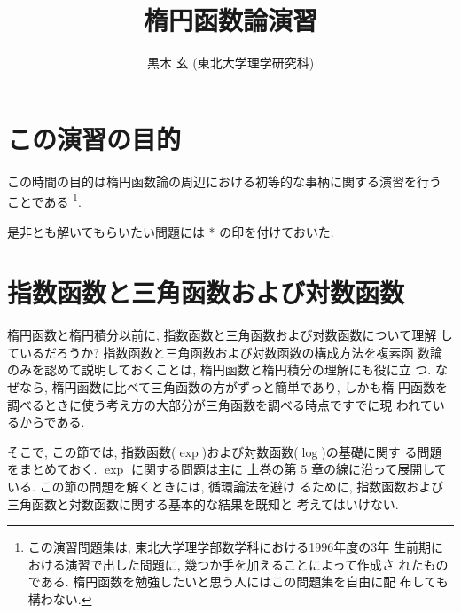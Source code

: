 \documentclass[12pt,twoside]{jarticle}
\begin{document}

\title{\bfseries 楕円函数論演習}

\author{黒木 玄 \quad (東北大学理学研究科)}

\date{\VERSION}

\maketitle


\begin{small}
\tableofcontents
\end{small}


\section{この演習の目的}

この時間の目的は楕円函数論の周辺における初等的な事柄に関する演習を行う
ことである%
\footnote{この演習問題集は, 東北大学理学部数学科における1996年度の3年
  生前期における演習で出した問題に, 幾つか手を加えることによって作成さ
  れたものである. 楕円函数を勉強したいと思う人にはこの問題集を自由に配
  布しても構わない.}.

\medskip\noindent
{\Large 是非とも解いてもらいたい問題には * の印を付けておいた.}


\section{指数函数と三角函数および対数函数}

楕円函数と楕円積分以前に, 指数函数と三角函数および対数函数について理解
しているだろうか?  指数函数と三角函数および対数函数の構成方法を複素函
数論のみを認めて説明しておくことは, 楕円函数と楕円積分の理解にも役に立
つ. なぜなら, 楕円函数に比べて三角函数の方がずっと簡単であり, しかも楕
円函数を調べるときに使う考え方の大部分が三角函数を調べる時点ですでに現
われているからである.

そこで, この節では, 指数函数($\exp$)および対数函数($\log$)の基礎に関す
る問題をまとめておく. $\exp$ に関する問題は主に \cite{Kazu} 上巻の第 5 
章の線に沿って展開している. この節の問題を解くときには, 循環論法を避け
るために, 指数函数および三角函数と対数函数に関する基本的な結果を既知と
考えてはいけない.
\end{document}
